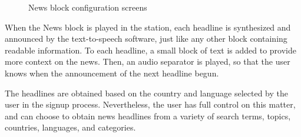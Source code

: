 \begin{figure}[htbp]
	\centering
	 \qquad
	 \qquad
	\caption{News block configuration screens}
	\label{fig:mfp1}
\end{figure}


When the News block is played in the station, each headline is synthesized and announced by the text-to-speech software, just like any other block containing readable information. To each headline, a small block of text is added to provide more context on the news. Then, an audio separator is played, so that the user knows when the announcement of the next headline begun.

The headlines are obtained based on the country and language selected by the user in the signup process. Nevertheless, the user has full control on this matter, and can choose to obtain news headlines from a variety of search terms, topics, countries, languages, and categories.



